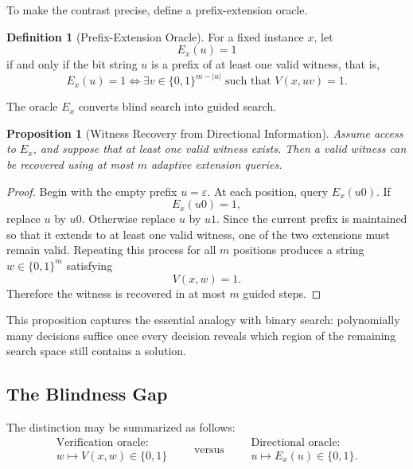 \documentclass[11pt]{article}
\theoremstyle{plain}
\newtheorem{proposition}[theorem]{Proposition}
\theoremstyle{definition}
\newtheorem{definition}[theorem]{Definition}
\begin{document}
To make the contrast precise, define a prefix-extension oracle.

\begin{definition}[Prefix-Extension Oracle]
\label{def:prefix-extension-oracle}
For a fixed instance \(x\), let
\[
    E_x(u)=1
\]
if and only if the bit string \(u\) is a prefix of at least one valid witness,
that is,
\[
    E_x(u)=1
    \iff
    \exists v\in\{0,1\}^{m-|u|}
    \text{ such that }
    V(x,uv)=1.
\]
\end{definition}

The oracle \(E_x\) converts blind search into guided search.

\begin{proposition}[Witness Recovery from Directional Information]
\label{prop:guided-recovery}
Assume access to \(E_x\), and suppose that at least one valid witness exists.
Then a valid witness can be recovered using at most \(m\) adaptive extension
queries.
\end{proposition}

\begin{proof}
Begin with the empty prefix \(u=\varepsilon\).  At each position, query
\(E_x(u0)\).  If
\[
    E_x(u0)=1,
\]
replace \(u\) by \(u0\).  Otherwise replace \(u\) by \(u1\).  Since the current
prefix is maintained so that it extends to at least one valid witness, one of
the two extensions must remain valid.  Repeating this process for all \(m\)
positions produces a string \(w\in\{0,1\}^{m}\) satisfying
\[
    V(x,w)=1.
\]
Therefore the witness is recovered in at most \(m\) guided steps.
\end{proof}

This proposition captures the essential analogy with binary search:
polynomially many decisions suffice once every decision reveals which region
of the remaining search space still contains a solution.

\subsection{The Blindness Gap}

The distinction may be summarized as follows:
\[
\boxed{
\begin{array}{c}
\text{Verification oracle:}\\
w\longmapsto V(x,w)\in\{0,1\}
\end{array}
}
\qquad\text{versus}\qquad
\boxed{
\begin{array}{c}
\text{Directional oracle:}\\
u\longmapsto E_x(u)\in\{0,1\}.
\end{array}
}
\]
\end{document}
